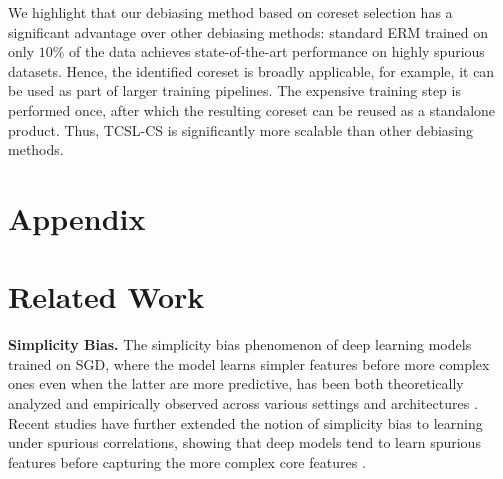 \documentclass[letter,11pt]{article}
\begin{document}
We highlight that our debiasing method based on coreset selection has a significant advantage over other debiasing methods: standard ERM trained on only $10\%$ of the data achieves state-of-the-art performance on highly spurious datasets. Hence, the identified coreset is broadly applicable, for example, it can be used as part of larger training pipelines. The expensive training step is performed once, after which the resulting coreset can be reused as a standalone product. Thus, TCSL-CS is significantly more scalable than other debiasing methods.



\newpage

\onecolumn

\setcounter{section}{0}
\setcounter{table}{3}
\setcounter{figure}{4}
\setcounter{assumption}{0}
\setcounter{theorem}{-1}
\setcounter{equation}{3}
\setcounter{algorithm}{2}

\appendix
\section*{Appendix}
\startcontents[appendix]

\newpage
\section{Related Work}\label{sec:app_related_work}

\noindent \textbf{Simplicity Bias.} The simplicity bias phenomenon of deep learning models trained on SGD, where the model learns simpler features before more complex ones even when the latter are more predictive, has been both theoretically analyzed and empirically observed across various settings and architectures \citep{SIMP_BIAS_1, SIMP_BIAS_2, SIMP_BIAS_3}. Recent studies have further extended the notion of simplicity bias to learning under spurious correlations, showing that deep models tend to learn spurious features before capturing the more complex core features \citep{SPARE,COMP_MATTERS,PDE,SIMP_BIAS_THEORY}.
\end{document}
